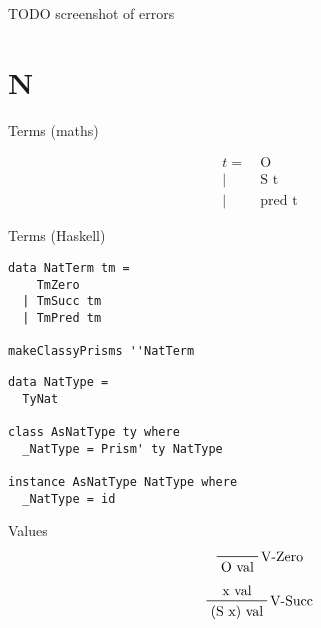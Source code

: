 \documentclass{beamer}
\begin{document}
\begin{frame}[fragile]
TODO screenshot of errors
\end{frame} 

\section{N}

\begin{frame}[c]
  \begin{center}
Terms (maths) 
  \end{center}
  \begin{displaymath}
    \begin{aligned}
t =& \ \text{O} \\
  |& \ \text{S t} \\
  |& \ \text{pred t}
    \end{aligned}
  \end{displaymath}
\end{frame}

\begin{frame}[fragile]
  \begin{center}
Terms (Haskell) 
  \end{center}
  \begin{verbatim}
data NatTerm tm =
    TmZero
  | TmSucc tm
  | TmPred tm

makeClassyPrisms ''NatTerm
  \end{verbatim}
\end{frame} 

\begin{frame}[fragile]
\begin{verbatim}
data NatType =
  TyNat

class AsNatType ty where
  _NatType = Prism' ty NatType

instance AsNatType NatType where
  _NatType = id
\end{verbatim}
\end{frame}


\begin{frame}[c]
  Values
  \begin{displaymath}  
    \prftree[r]{V-Zero}
    {\text{O val}}
  \end{displaymath} 
  \begin{displaymath}  
    \prftree[r]{V-Succ}
    {\text{x val}}
    {\text{(S x) val}}
  \end{displaymath} 
\end{frame}
\end{document}
